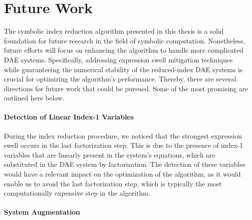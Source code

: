 \section{Future Work}

The symbolic index reduction algorithm presented in this thesis is a solid foundation for future research in the field of symbolic computation. Nonetheless, future efforts will focus on enhancing the algorithm to handle more complicated \ac{DAE} systems. Specifically, addressing expression swell mitigation techniques while guaranteeing the numerical stability of the reduced-index \ac{DAE} systems is crucial for optimizing the algorithm's performance. Thereby, there are several directions for future work that could be pursued. Some of the most promising are outlined here below.

\paragraph{Detection of Linear Index-1 Variables}

During the index reduction procedure, we noticed that the strongest expression swell occurs in the last factorization step. This is due to the presence of index-1 variables that are linearly present in the system's equations, which are substituted in the \ac{DAE} system by factorization. The detection of these variables would have a relevant impact on the optimization of the algorithm, as it would enable us to avoid the last factorization step, which is typically the most computationally expensive step in the algorithm.

\paragraph{System Augmentation}

